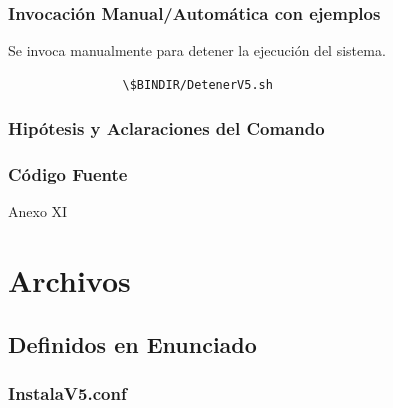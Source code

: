 \documentclass[a4paper,10pt,titlepage]{article}
\begin{document}
		\subsubsection{Invocaci\'on Manual/Autom\'atica con ejemplos}
			Se invoca manualmente para detener la ejecuci\'on del sistema.
			\begin{verbatim}
				\$BINDIR/DetenerV5.sh
			\end{verbatim}

		\subsubsection{Hip\'otesis y Aclaraciones del Comando}

		\subsubsection{C\'odigo Fuente}
			Anexo XI

\section{Archivos}

	\subsection{Definidos en Enunciado}
		
		\subsubsection{InstalaV5.conf}
\end{document}
